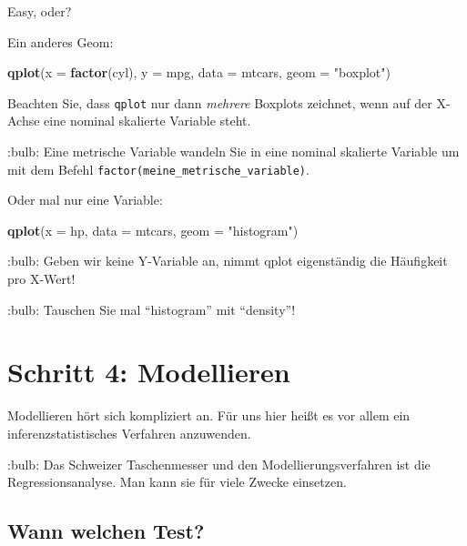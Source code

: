 \documentclass[]{article}
\newenvironment{Shaded}{\begin{snugshade}}{\end{snugshade}}
\newcommand{\DataTypeTok}[1]{\textcolor[rgb]{0.13,0.29,0.53}{#1}}
\newcommand{\KeywordTok}[1]{\textcolor[rgb]{0.13,0.29,0.53}{\textbf{#1}}}
\newcommand{\NormalTok}[1]{#1}
\newcommand{\StringTok}[1]{\textcolor[rgb]{0.31,0.60,0.02}{#1}}
\begin{document}
Easy, oder?

Ein anderes Geom:

\begin{Shaded}
\begin{Highlighting}[]
\KeywordTok{qplot}\NormalTok{(}\DataTypeTok{x =} \KeywordTok{factor}\NormalTok{(cyl),}
      \DataTypeTok{y =}\NormalTok{ mpg,}
      \DataTypeTok{data =}\NormalTok{ mtcars,}
      \DataTypeTok{geom =} \StringTok{"boxplot"}\NormalTok{)}
\end{Highlighting}
\end{Shaded}

Beachten Sie, dass \texttt{qplot} nur dann \emph{mehrere} Boxplots
zeichnet, wenn auf der X-Achse eine nominal skalierte Variable steht.

:bulb: Eine metrische Variable wandeln Sie in eine nominal skalierte
Variable um mit dem Befehl \texttt{factor(meine\_metrische\_variable)}.

Oder mal nur eine Variable:

\begin{Shaded}
\begin{Highlighting}[]
\KeywordTok{qplot}\NormalTok{(}\DataTypeTok{x =}\NormalTok{ hp,}
      \DataTypeTok{data =}\NormalTok{ mtcars,}
      \DataTypeTok{geom =} \StringTok{"histogram"}\NormalTok{)}
\end{Highlighting}
\end{Shaded}

:bulb: Geben wir keine Y-Variable an, nimmt qplot eigenständig die
Häufigkeit pro X-Wert!

:bulb: Tauschen Sie mal ``histogram'' mit ``density''!

\hypertarget{schritt-4-modellieren}{%
\section{Schritt 4: Modellieren}\label{schritt-4-modellieren}}

Modellieren hört sich kompliziert an. Für uns hier heißt es vor allem
ein inferenzstatistisches Verfahren anzuwenden.

:bulb: Das Schweizer Taschenmesser und den Modellierungsverfahren ist
die Regressionsanalyse. Man kann sie für viele Zwecke einsetzen.

\hypertarget{wann-welchen-test}{%
\subsection{Wann welchen Test?}\label{wann-welchen-test}}
\end{document}
